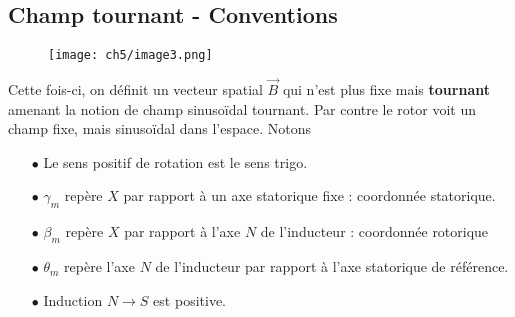 	\subsection{Champ tournant - Conventions}
	\begin{wrapfigure}[11]{l}{4cm}
	\texttt{[image: ch5/image3.png]}
	\end{wrapfigure}
	Cette fois-ci, on définit un vecteur spatial $\vec{B}$ qui n'est plus fixe 
	mais \textbf{tournant} amenant la notion de champ sinusoïdal tournant. Par 
	contre le rotor voit un champ fixe, mais sinusoïdal dans l'espace. Notons 
	\begin{itemize}
	\item[$\bullet$] Le sens positif de rotation est le sens trigo.
	\item[$\bullet$] $\gamma_m$ repère $X$ par rapport à un axe statorique 
	fixe : coordonnée statorique.
	\item[$\bullet$] $\beta_m$ repère $X$ par rapport à l'axe $N$ de l'inducteur :
	coordonnée rotorique
	\item[$\bullet$] $\theta_m$ repère l'axe $N$ de l'inducteur par rapport à 
	l'axe statorique de référence.
	\item[$\bullet$] Induction $N \rightarrow S$ est positive.		
	\end{itemize}
	
	
